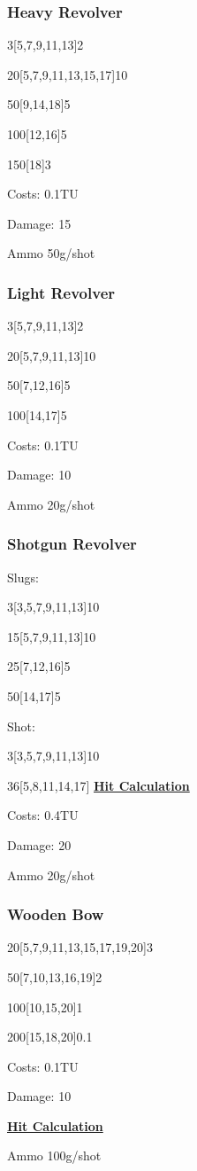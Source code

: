 \subsubsection{Heavy Revolver}
3[5,7,9,11,13]2\par
20[5,7,9,11,13,15,17]10\par
50[9,14,18]5\par
100[12,16]5\par
150[18]3\par
Costs: 0.1TU\par
Damage: 15\par
Ammo 50g/shot

\subsubsection{Light Revolver}
3[5,7,9,11,13]2\par
20[5,7,9,11,13]10\par
50[7,12,16]5\par
100[14,17]5\par
Costs: 0.1TU\par
Damage: 10\par
Ammo 20g/shot

\subsubsection{Shotgun Revolver}
Slugs:\par
3[3,5,7,9,11,13]10\par
15[5,7,9,11,13]10\par
25[7,12,16]5\par
50[14,17]5\par
Shot:\par
3[3,5,7,9,11,13]10\par
36[5,8,11,14,17]
\hyperref[subsec:hit]{\textbf{Hit Calculation}} \par
[10,20,30,40,50,60,70,80,90,100]
Costs: 0.4TU\par
Damage: 20\par
Ammo 20g/shot


\subsubsection{Wooden Bow}
20[5,7,9,11,13,15,17,19,20]3\par
50[7,10,13,16,19]2\par
100[10,15,20]1\par
200[15,18,20]0.1\par
Costs: 0.1TU\par
Damage: 10\par
\hyperref[subsec:hit]{\textbf{Hit Calculation}} \par
[0,80,100,150]
Ammo 100g/shot

